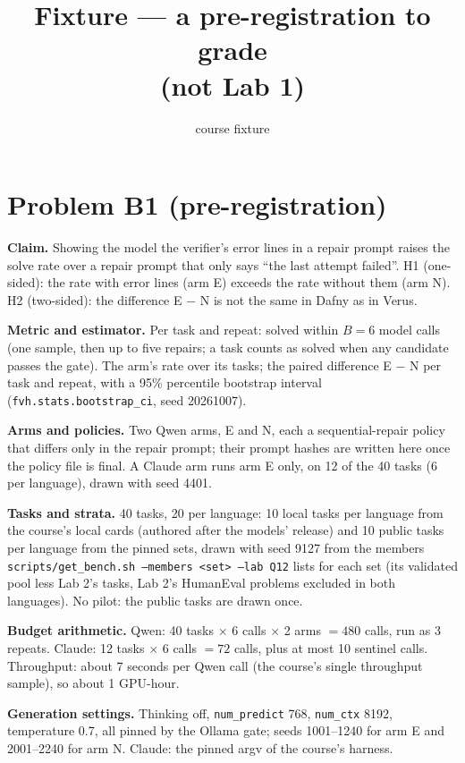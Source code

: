 \documentclass[11pt]{article}
\title{Fixture --- a pre-registration to grade \\ \large (not Lab 1)}
\author{course fixture}
\date{}
\begin{document}
\maketitle

\section*{Problem B1 (pre-registration)}\label{ans:B1}
\begin{answer}
\textbf{Claim.} Showing the model the verifier's error lines in a repair prompt
raises the solve rate over a repair prompt that only says ``the last attempt
failed''. H1 (one-sided): the rate with error lines (arm E) exceeds the rate
without them (arm N). H2 (two-sided): the difference E $-$ N is not the same
in Dafny as in Verus.

\textbf{Metric and estimator.} Per task and repeat: solved within $B = 6$ model
calls (one sample, then up to five repairs; a task counts as solved when any
candidate passes the gate). The arm's rate over its tasks; the paired difference
E $-$ N per task and repeat, with a 95\% percentile bootstrap interval
(\texttt{fvh.stats.bootstrap\_ci}, seed 20261007).

\textbf{Arms and policies.} Two Qwen arms, E and N, each a sequential-repair
policy that differs only in the repair prompt; their prompt hashes are written
here once the policy file is final. A Claude arm runs arm E only, on 12 of the
40 tasks (6 per language), drawn with seed 4401.

\textbf{Tasks and strata.} 40 tasks, 20 per language: 10 local tasks per language
from the course's local cards (authored after the models' release) and 10
public tasks per language from the pinned sets, drawn with seed 9127 from the
members \texttt{scripts/get\_bench.sh --members <set> --lab Q12} lists for each set
(its validated pool less Lab 2's tasks, Lab 2's HumanEval problems excluded in both
languages). No pilot: the public tasks are drawn once.

\textbf{Budget arithmetic.} Qwen: 40 tasks $\times$ 6 calls $\times$ 2 arms
$= 480$ calls, run as 3 repeats. Claude: 12 tasks $\times$ 6 calls $= 72$
calls, plus at most 10 sentinel calls. Throughput: about 7 seconds per Qwen
call (the course's single throughput sample), so about 1 GPU-hour.

\textbf{Generation settings.} Thinking off, \texttt{num\_predict} 768,
\texttt{num\_ctx} 8192, temperature 0.7, all pinned by the Ollama gate; seeds
1001--1240 for arm E and 2001--2240 for arm N. Claude: the pinned argv of the
course's harness.


\end{answer}
\end{document}
